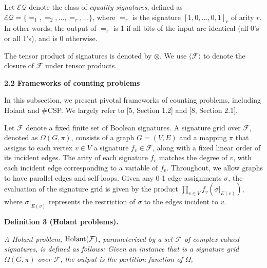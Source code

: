 \documentclass[10pt,a4paper]{article}
\begin{document}
Let $\mathcal{EQ}$ denote the class of \emph{equality signatures}, defined as $\mathcal{EQ}=\{=_{1},=_{2},\ldots,=_{r},\ldots\}$, where $=_{r}$ is the signature $[1,0,\ldots,0,1]_{r}$ of arity $r$. In other words, the output of $=_{r}$ is 1 if all bits of the input are identical (all 0’s or all 1’s), and is 0 otherwise.\par




The tensor product of signatures is denoted by $\otimes$. We use $\langle\mathcal{F}\rangle$ to denote the closure of $\mathcal{F}$ under tensor products.\par





\par\medskip\noindent\textbf{
2.2 Frameworks of counting problems}\par




In this subsection, we present pivotal frameworks of counting problems, including Holant and \#CSP. We largely refer to [5, Section 1.2] and [8, Section 2.1].\par




Let $\mathcal{F}$ denote a fixed finite set of Boolean signatures. A signature grid over $\mathcal{F}$, denoted as $\Omega(G,\pi)$, consists of a graph $G=(V,E)$ and a mapping $\pi$ that assigns to each vertex $v\in V$ a signature $f_{v}\in\mathcal{F}$, along with a fixed linear order of its incident edges. The arity of each signature $f_{v}$ matches the degree of $v$, with each incident edge corresponding to a variable of $f_{v}$. Throughout, we allow graphs to have parallel edges and self-loops. Given any 0-1 edge assignments $\sigma$, the evaluation of the signature grid is given by the product $\prod_{v\in V}f_{v}(\sigma|_{E(v)})$, where $\sigma|_{E(v)}$ represents the restriction of $\sigma$ to the edges incident to $v$.\par





\par\medskip\noindent\textbf{
\textbf{Definition 3}\textbf{ }(Holant problems)\textbf{.}
}\par



\emph{A Holant problem, $\textup{{Holant}}(\mathcal{F})$, parameterized by a set $\mathcal{F}$ of complex-valued signatures, is defined as follows: Given an instance that is a signature grid $\Omega(G,\pi)$ over $\mathcal{F}$, the output is the partition function of $\Omega$,}\par
\end{document}
